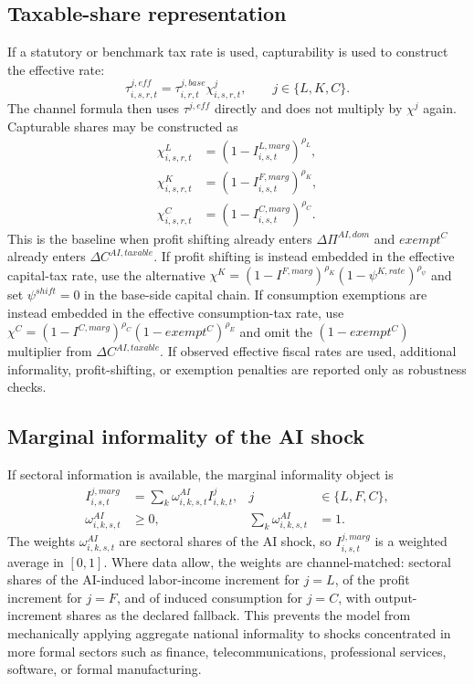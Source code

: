 \documentclass[11pt,a4paper]{article}
\begin{document}
\subsection{Taxable-share representation}

If a statutory or benchmark tax rate is used, capturability is used to construct the effective rate:
\begin{equation}\label{eq:tau_eff_informal_v10}
    \tau^{j,eff}_{i,s,r,t}=\tau^{j,base}_{i,r,t}\chi^j_{i,s,r,t},
    \qquad j\in\{L,K,C\}.
\end{equation}
The channel formula then uses $\tau^{j,eff}$ directly and does not multiply by $\chi^j$ again. Capturable shares may be constructed as
\begin{align}
    \chi^L_{i,s,r,t}&=(1-I^{L,marg}_{i,s,t})^{\rho_L},\\
    \chi^K_{i,s,r,t}&=(1-I^{F,marg}_{i,s,t})^{\rho_K},\\
    \chi^C_{i,s,r,t}&=(1-I^{C,marg}_{i,s,t})^{\rho_C}.
\end{align}
This is the baseline when profit shifting already enters $\Delta\Pi^{AI,dom}$ and $exempt^C$ already enters $\Delta C^{AI,taxable}$. If profit shifting is instead embedded in the effective capital-tax rate, use the alternative $\chi^K=(1-I^{F,marg})^{\rho_K}(1-\psi^{K,rate})^{\rho_\psi}$ and set $\psi^{shift}=0$ in the base-side capital chain. If consumption exemptions are instead embedded in the effective consumption-tax rate, use $\chi^C=(1-I^{C,marg})^{\rho_C}(1-exempt^C)^{\rho_E}$ and omit the $(1-exempt^C)$ multiplier from $\Delta C^{AI,taxable}$. If observed effective fiscal rates are used, additional informality, profit-shifting, or exemption penalties are reported only as robustness checks.

\subsection{Marginal informality of the AI shock}\label{subsec:marginal_informality}

If sectoral information is available, the marginal informality object is
\begin{equation}
\begin{aligned}
    I^{j,marg}_{i,s,t}&=\sum_k \omega^{AI}_{i,k,s,t}I^j_{i,k,t},
    &j&\in\{L,F,C\},\\
    \omega^{AI}_{i,k,s,t}&\geq0,
    &\sum_k\omega^{AI}_{i,k,s,t}&=1.
\end{aligned}
\end{equation}
The weights $\omega^{AI}_{i,k,s,t}$ are sectoral shares of the AI shock, so $I^{j,marg}_{i,s,t}$ is a weighted average in $[0,1]$. Where data allow, the weights are channel-matched: sectoral shares of the AI-induced labor-income increment for $j=L$, of the profit increment for $j=F$, and of induced consumption for $j=C$, with output-increment shares as the declared fallback. This prevents the model from mechanically applying aggregate national informality to shocks concentrated in more formal sectors such as finance, telecommunications, professional services, software, or formal manufacturing.
\end{document}
